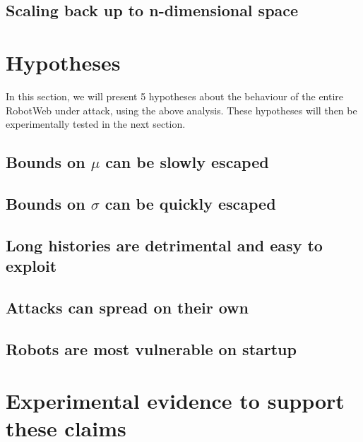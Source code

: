 \subsection{Scaling back up to n-dimensional space}

\section{Hypotheses}
In this section, we will present 5 hypotheses about the behaviour of the entire RobotWeb under attack, using the above analysis. 
These hypotheses will then be experimentally tested in the next section.

\subsection{Bounds on $\mu$ can be slowly escaped} %
\subsection{Bounds on $\sigma$ can be quickly escaped} %
\subsection{Long histories are detrimental and easy to exploit} %
\subsection{Attacks can spread on their own} %
\subsection{Robots are most vulnerable on startup}

\section{Experimental evidence to support these claims}
